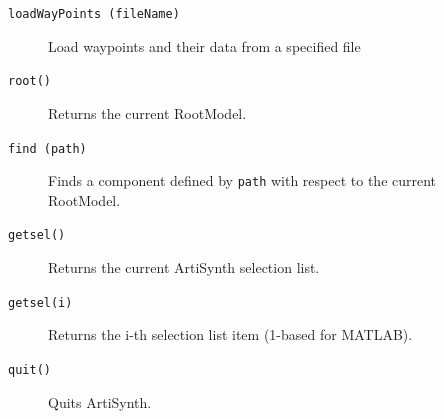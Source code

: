 \documentclass{article}
\begin{document}
\begin{description}
\item[{\tt loadWayPoints (fileName)}] \mbox{}

Load waypoints and their data from a specified file

\item[{\tt root()}] \mbox{}

Returns the current RootModel.

\item[{\tt find (path)}] \mbox{}

Finds a component defined by {\tt path} with respect to the current RootModel.

\item[{\tt getsel()}] \mbox{}

Returns the current ArtiSynth selection list.

\item[{\tt getsel(i)}] \mbox{}

Returns the i-th selection list item (1-based for MATLAB).

\item[{\tt quit()}] \mbox{}

Quits ArtiSynth.

\end{description}
\end{document}
